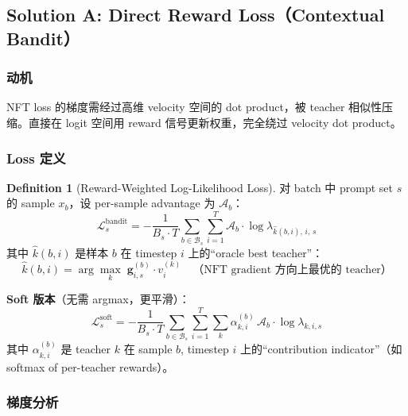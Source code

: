\documentclass[11pt,a4paper]{article}
\newcommand{\loss}{\mathcal{L}}
\newcommand{\adv}{\mathcal{A}}
\theoremstyle{definition}
\newtheorem{definition}{Definition}
\begin{document}
\subsection{Solution A: Direct Reward Loss（Contextual Bandit）}

\subsubsection{动机}
NFT loss 的梯度需经过高维 velocity 空间的 dot product，被 teacher 相似性压缩。直接在 logit 空间用 reward 信号更新权重，完全绕过 velocity dot product。

\subsubsection{Loss 定义}

\begin{definition}[Reward-Weighted Log-Likelihood Loss]
\label{def:reward_loss}
对 batch 中 prompt set $s$ 的 sample $x_b$，设 per-sample advantage 为 $\adv_b$：
\begin{equation}
\boxed{
\loss^{\mathrm{bandit}}_s = -\frac{1}{B_s \cdot T}\sum_{b \in \mathcal{B}_s}\sum_{i=1}^T \adv_b \cdot \log \lambda_{\hat{k}(b,i),\,i,\,s}
}
\label{eq:bandit_loss}
\end{equation}
其中 $\hat{k}(b,i)$ 是样本 $b$ 在 timestep $i$ 上的``oracle best teacher''：
\begin{equation}
\hat{k}(b,i) = \arg\max_k\; \mathbf{g}^{(b)}_{i,s} \cdot v^{(k)}_i \quad\text{（NFT gradient 方向上最优的 teacher）}
\end{equation}

\textbf{Soft 版本}（无需 argmax，更平滑）：
\begin{equation}
\boxed{
\loss^{\mathrm{soft}}_s = -\frac{1}{B_s \cdot T}\sum_{b \in \mathcal{B}_s}\sum_{i=1}^T \sum_k \alpha^{(b)}_{k,i}\, \adv_b \cdot \log \lambda_{k,i,s}
}
\label{eq:soft_bandit_loss}
\end{equation}
其中 $\alpha^{(b)}_{k,i}$ 是 teacher $k$ 在 sample $b$, timestep $i$ 上的``contribution indicator''（如 softmax of per-teacher rewards）。
\end{definition}

\subsubsection{梯度分析}
\end{document}

